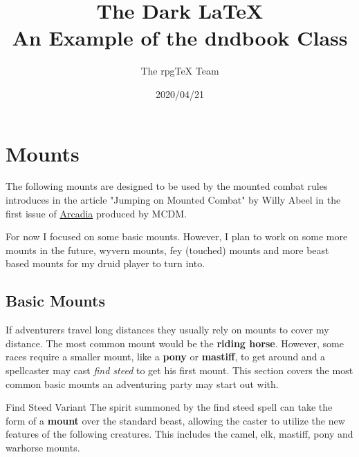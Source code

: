 \documentclass[letterpaper,twocolumn,openany,nodeprecatedcode]{dndbook}
\title{The Dark \LaTeX{} \\
\large An Example of the dndbook Class}
\author{The rpgTeX Team}
\date{2020/04/21}
\begin{document}
\frontmatter



\mainmatter

\chapter{Mounts}

The following mounts are designed to be used by the mounted combat rules introduces in the article "Jumping on Mounted Combat" by Willy Abeel in the first issue of \href{https://www.youtube.com/watch?v=oid4QMMXjfs}{Arcadia} produced by MCDM.

For now I focused on some basic mounts. However, I plan to work on some more mounts in the future, wyvern mounts, fey (touched) mounts and more beast based mounts for my druid player to turn into.

\section{Basic Mounts}

If adventurers travel long distances they usually rely on mounts to cover my distance. The most common mount would be the \textbf{riding horse}. However, some races require a smaller mount, like a \textbf{pony} or \textbf{mastiff}, to get around and a spellcaster may cast \textit{find steed} to get his first mount. This section covers the most common basic mounts an adventuring party may start out with.

\begin{DndComment}{Find Steed Variant}
    The spirit summoned by the find steed spell can take the form of a \textbf{mount} over the standard beast, allowing the caster to utilize the new features of the following creatures. This includes the camel, elk, mastiff, pony and warhorse mounts.
\end{DndComment}
\end{document}
